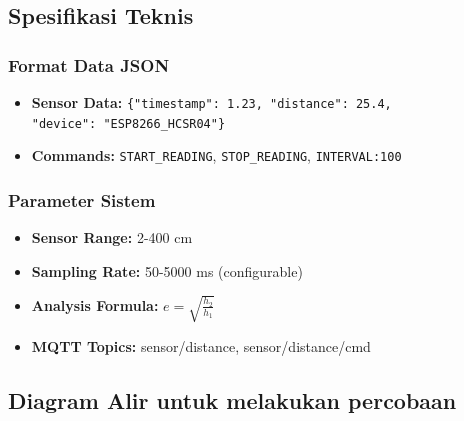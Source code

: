 \subsection{Spesifikasi Teknis}

\subsubsection{Format Data JSON}
\begin{itemize}
    \item \textbf{Sensor Data:} \texttt{\{"timestamp": 1.23, "distance": 25.4, \\ "device": "ESP8266\_HCSR04"\}}
    \item \textbf{Commands:} \texttt{START\_READING}, \texttt{STOP\_READING}, \texttt{INTERVAL:100}
\end{itemize}

\subsubsection{Parameter Sistem}
\begin{itemize}
    \item \textbf{Sensor Range:} 2-400 cm
    \item \textbf{Sampling Rate:} 50-5000 ms (configurable)
    \item \textbf{Analysis Formula:} $e = \sqrt{\frac{h_2}{h_1}}$
    \item \textbf{MQTT Topics:} sensor/distance, sensor/distance/cmd
\end{itemize}

\subsection{Diagram Alir untuk melakukan percobaan}

